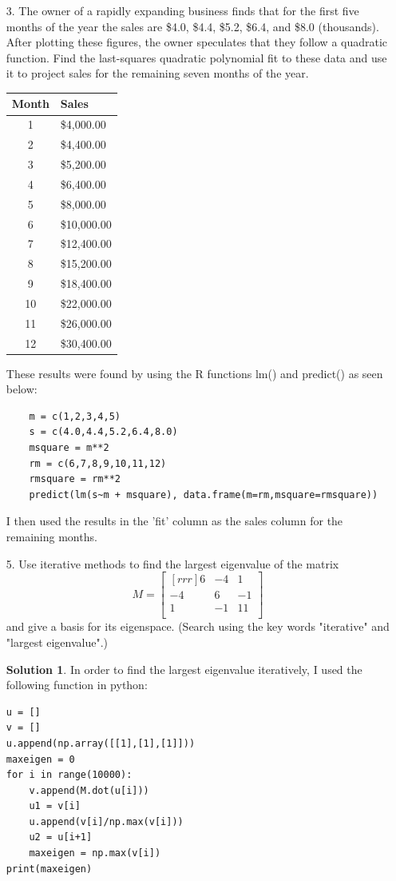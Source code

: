 \documentclass[12pt]{article}
\theoremstyle{definition}
\newtheorem*{solution}{Solution} %
\theoremstyle{plain}
\begin{document}
\begin{enumerate}
\item[3.]The owner of a rapidly expanding business finds that for the first five months of the year the sales are \$4.0, \$4.4, \$5.2, \$6.4, and \$8.0 (thousands). After plotting these figures, the owner speculates that they follow a quadratic function. Find the last-squares quadratic polynomial fit to these data and use it to project sales for the remaining seven months of the year.
	\begin{center}
	\begin{tabular}{c|l}
	Month&Sales\\
	\hline
	1&\$4,000.00\\
	2&\$4,400.00\\
	3&\$5,200.00\\
	4&\$6,400.00\\
	5&\$8,000.00\\
	6&\$10,000.00\\
	7&\$12,400.00\\
	8&\$15,200.00\\
	9&\$18,400.00\\
	10&\$22,000.00\\
	11&\$26,000.00\\
	12&\$30,400.00\\
	\end{tabular}
	\end{center}
	These results were found by using the R functions lm() and predict() as seen below:
	\begin{verbatim}
	m = c(1,2,3,4,5)
	s = c(4.0,4.4,5.2,6.4,8.0)
	msquare = m**2
	rm = c(6,7,8,9,10,11,12)
	rmsquare = rm**2
	predict(lm(s~m + msquare), data.frame(m=rm,msquare=rmsquare))
	\end{verbatim}
	I then used the results in the 'fit' column as the sales column for the remaining months.

\item[5.] Use iterative methods to find the largest eigenvalue of the matrix
\[ M = \begin{bmatrix}[rrr]6&-4&1\\-4&6&-1\\1&-1&11\\\end{bmatrix} \]
and give a basis for its eigenspace. (Search using the key words "iterative" and "largest eigenvalue".)
\begin{solution}
In order to find the largest eigenvalue iteratively, I used the following function in python:
\begin{verbatim}
u = []
v = []
u.append(np.array([[1],[1],[1]]))
maxeigen = 0
for i in range(10000):
    v.append(M.dot(u[i]))
    u1 = v[i]
    u.append(v[i]/np.max(v[i]))
    u2 = u[i+1]
    maxeigen = np.max(v[i])
print(maxeigen)
\end{verbatim}


\end{solution}
\end{enumerate}
\end{document}
